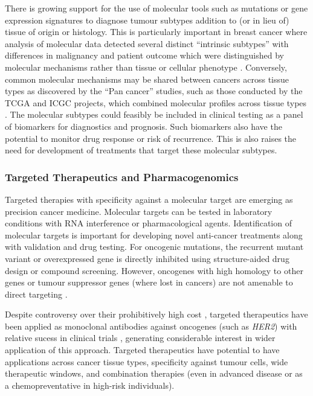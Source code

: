 There is growing support for the use of molecular tools such as mutations or gene expression signatures to diagnose tumour subtypes addition to (or in lieu of) tissue of origin or histology. This is particularly important in breast cancer where analysis of molecular data detected several distinct ``intrinsic subtypes'' with differences in malignancy and patient outcome which were distinguished by molecular mechanisms rather than tissue or cellular phenotype \citep{Perou2000, Parker2009}. Conversely, common molecular mechanisms may be shared between cancers across tissue types as discovered by the ``Pan cancer'' studies, such as those conducted by the \gls{TCGA} and \gls{ICGC} projects, which combined molecular profiles across tissue types \citet{TCGA2013PAN}. The molecular subtypes could feasibly be included in clinical testing as a panel of biomarkers for diagnostics and prognosis. Such biomarkers also have the potential to monitor drug response or risk of recurrence. This is also raises the need for development of treatments that target these molecular subtypes.  

\subsubsection{Targeted Therapeutics and Pharmacogenomics}
Targeted therapies with specificity against a molecular target are emerging as precision cancer medicine. Molecular targets can be tested in laboratory conditions with \gls{RNA} interference or pharmacological agents. Identification of molecular targets is important for developing novel anti-cancer treatments along with validation and drug testing. For oncogenic mutations, the recurrent mutant variant or overexpressed gene is directly inhibited using structure-aided drug design or compound screening. However, oncogenes with high homology to other genes or tumour suppressor genes (where lost in cancers) are not amenable to direct targeting \citep{Kaelin2009}.



Despite controversy over their prohibitively high cost \citep{Pharmac2016}, targeted therapeutics have been applied as monoclonal antibodies against oncogenes (such as \textit{HER2}) with relative sucess in clinical trials \citep{Miles2001}, generating considerable interest in wider application of this approach. Targeted therapeutics have potential to have applications across cancer tissue types, specificity against tumour cells, wide therapeutic windows, and combination therapies (even in advanced disease or as a chemopreventative in high-risk individuals).

